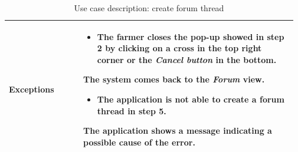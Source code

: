 \begin{table}[H]
\begin{tabular}{@{}p{0.25\linewidth} p{0.72\linewidth}@{}}
		\textbf{Exceptions}         & \begin{itemize}[leftmargin=.4cm,noitemsep,topsep=0pt,before=\vspace{-3mm}]
		   \item The farmer closes the pop-up showed in step 2 by clicking on a cross in the top right corner or the \textit{Cancel button} in the bottom.
		\end{itemize}
	    The system comes back to the \textit{Forum} view.
	    \begin{itemize}[leftmargin=.4cm,noitemsep,topsep=0pt]
		   \item The application is not able to create a forum thread in step 5. 
		\end{itemize}
		The application shows a message indicating a possible cause of the error.
        \\\bottomrule
	\end{tabular}
	\caption{Use case description: create forum thread} 
\end{table}


